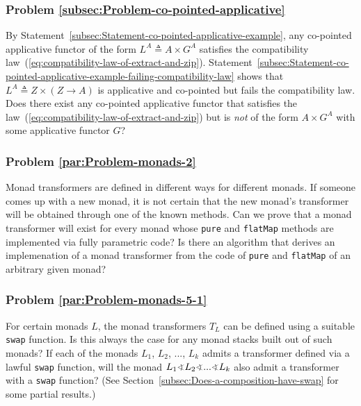 \subsubsection{Problem \label{subsec:Problem-co-pointed-applicative}\ref{subsec:Problem-co-pointed-applicative}}

By Statement~\ref{subsec:Statement-co-pointed-applicative-example},
any co-pointed applicative functor of the form $L^{A}\triangleq A\times G^{A}$
satisfies the compatibility law~(\ref{eq:compatibility-law-of-extract-and-zip}).
Statement~\ref{subsec:Statement-co-pointed-applicative-example-failing-compatibility-law}
shows that $L^{A}\triangleq Z\times\left(Z\rightarrow A\right)$ is
applicative and co-pointed but fails the compatibility law. Does there
exist any co-pointed applicative functor that satisfies the law~(\ref{eq:compatibility-law-of-extract-and-zip})
but is \emph{not} of the form $A\times G^{A}$ with some applicative
functor $G$? 

\subsubsection{Problem \label{par:Problem-monads-2}\ref{par:Problem-monads-2}}

Monad transformers are defined in different ways for different monads.
If someone comes up with a new monad, it is not certain that the new
monad\textsf{'}s transformer will be obtained through one of the known methods.
Can we prove that a monad transformer will exist for every monad whose
\lstinline!pure! and \lstinline!flatMap! methods are implemented
via fully parametric code? Is there an algorithm that derives an implemenation
of a monad transformer from the code of \lstinline!pure! and \lstinline!flatMap!
of an arbitrary given monad?

\subsubsection{Problem \label{par:Problem-monads-5-1}\ref{par:Problem-monads-5-1}}

For certain monads $L$, the monad transformers $T_{L}$ can be defined
using a suitable \lstinline!swap! function. Is this always the case
for any monad stacks built out of such monads? If each of the monads
$L_{1}$, $L_{2}$, ..., $L_{k}$ admits a transformer defined via
a lawful \lstinline!swap! function, will the monad $L_{1}\varangle L_{2}\varangle...\varangle L_{k}$
also admit a transformer with a \lstinline!swap! function? (See Section~\ref{subsec:Does-a-composition-have-swap}
for some partial results.)

